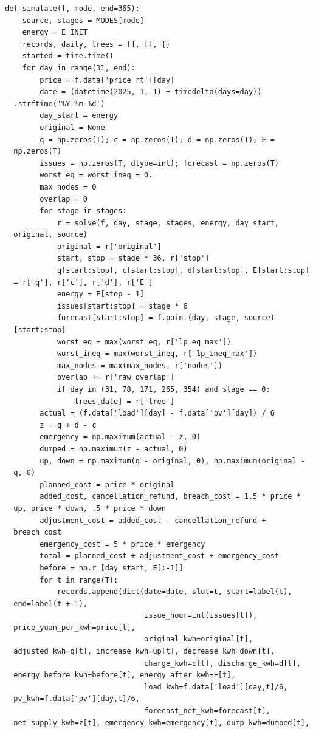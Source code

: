 \begin{verbatim}
def simulate(f, mode, end=365):
    source, stages = MODES[mode]
    energy = E_INIT
    records, daily, trees = [], [], {}
    started = time.time()
    for day in range(31, end):
        price = f.data['price_rt'][day]
        date = (datetime(2025, 1, 1) + timedelta(days=day))
  .strftime('%Y-%m-%d')
        day_start = energy
        original = None
        q = np.zeros(T); c = np.zeros(T); d = np.zeros(T); E =
  np.zeros(T)
        issues = np.zeros(T, dtype=int); forecast = np.zeros(T)
        worst_eq = worst_ineq = 0.
        max_nodes = 0
        overlap = 0
        for stage in stages:
            r = solve(f, day, stage, stages, energy, day_start,
  original, source)
            original = r['original']
            start, stop = stage * 36, r['stop']
            q[start:stop], c[start:stop], d[start:stop], E[start:stop]
  = r['q'], r['c'], r['d'], r['E']
            energy = E[stop - 1]
            issues[start:stop] = stage * 6
            forecast[start:stop] = f.point(day, stage, source)
  [start:stop]
            worst_eq = max(worst_eq, r['lp_eq_max'])
            worst_ineq = max(worst_ineq, r['lp_ineq_max'])
            max_nodes = max(max_nodes, r['nodes'])
            overlap += r['raw_overlap']
            if day in (31, 78, 171, 265, 354) and stage == 0:
                trees[date] = r['tree']
        actual = (f.data['load'][day] - f.data['pv'][day]) / 6
        z = q + d - c
        emergency = np.maximum(actual - z, 0)
        dumped = np.maximum(z - actual, 0)
        up, down = np.maximum(q - original, 0), np.maximum(original -
  q, 0)
        planned_cost = price * original
        added_cost, cancellation_refund, breach_cost = 1.5 * price *
  up, price * down, .5 * price * down
        adjustment_cost = added_cost - cancellation_refund +
  breach_cost
        emergency_cost = 5 * price * emergency
        total = planned_cost + adjustment_cost + emergency_cost
        before = np.r_[day_start, E[:-1]]
        for t in range(T):
            records.append(dict(date=date, slot=t, start=label(t),
  end=label(t + 1),
                                issue_hour=int(issues[t]),
  price_yuan_per_kwh=price[t],
                                original_kwh=original[t],
  adjusted_kwh=q[t], increase_kwh=up[t], decrease_kwh=down[t],
                                charge_kwh=c[t], discharge_kwh=d[t],
  energy_before_kwh=before[t], energy_after_kwh=E[t],
                                load_kwh=f.data['load'][day,t]/6,
  pv_kwh=f.data['pv'][day,t]/6,
                                forecast_net_kwh=forecast[t],
  net_supply_kwh=z[t], emergency_kwh=emergency[t], dump_kwh=dumped[t],

\end{verbatim}

